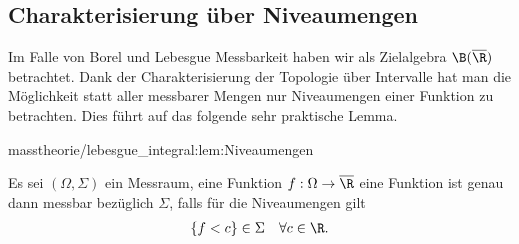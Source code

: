 \documentclass[letterpaper,10pt,german]{jupyterBook}
\begin{document}
\subsection{Charakterisierung über Niveaumengen}
\label{\detokenize{masstheorie/lebesgue_integral:charakterisierung-uber-niveaumengen}}
\par
Im Falle von Borel und Lebesgue Messbarkeit haben wir als Zielalgebra \(\B(\overline{\R})\) betrachtet. Dank der Charakterisierung der Topologie über Intervalle hat man die Möglichkeit statt aller messbarer Mengen nur Niveaumengen einer Funktion zu betrachten. Dies führt auf das folgende sehr praktische Lemma.
\begin{lemma}{}{masstheorie/lebesgue_integral:lem:Niveaumengen}



\par
Es sei \((\Omega,\Sigma)\) ein Messraum, eine Funktion \(f:\Omega\to\overline{\R}\) eine Funktion ist genau dann messbar bezüglich \(\Sigma\), falls
für die Niveaumengen gilt
\begin{align*}
\{f< c\}\in\Sigma\quad\forall c\in\R.
\end{align*}\end{lemma}
\end{document}
